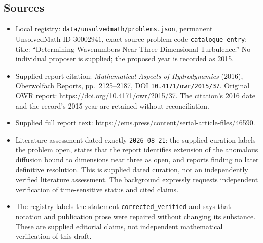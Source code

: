 \documentclass[11pt]{article}
\begin{document}
\subsection{Sources}
\begin{itemize}
\item Local registry: \texttt{data/unsolvedmath/problems.json}, permanent UnsolvedMath ID \(30002941\), exact source problem code \texttt{catalogue entry}; title: ``Determining Wavenumbers Near Three-Dimensional Turbulence.'' No individual proposer is supplied; the proposed year is recorded as 2015.
\item Supplied report citation: \emph{Mathematical Aspects of Hydrodynamics} (2016), Oberwolfach Reports, pp.~2125--2187, DOI \texttt{10.4171/owr/2015/37}. Original OWR report: \url{https://doi.org/10.4171/owr/2015/37}. The citation's 2016 date and the record's 2015 year are retained without reconciliation.
\item Supplied full report text: \url{https://ems.press/content/serial-article-files/46590}.
\item Literature assessment dated exactly \texttt{2026-08-21}: the supplied curation labels the problem open, states that the report identifies extension of the anomalous diffusion bound to dimensions near three as open, and reports finding no later definitive resolution. This is supplied dated curation, not an independently verified literature assessment. The background expressly requests independent verification of time-sensitive status and cited claims.
\item The registry labels the statement \texttt{corrected\_verified} and says that notation and publication prose were repaired without changing its substance. These are supplied editorial claims, not independent mathematical verification of this draft.
\end{itemize}
\end{document}
